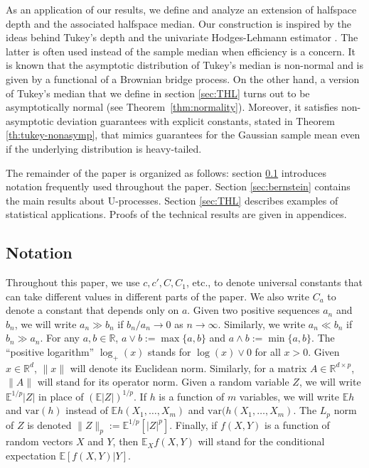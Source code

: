 \documentclass[12pt]{article}
\newcommand\var{\mathrm{var}}
\def\l{\left}
\def\r{\right}
\newcommand{\mb}{\mathbb}
\theoremstyle{thmstyletwo}%
\theoremstyle{thmstylethree}%
\begin{document}
As an application of our results, we define and analyze an extension of halfspace depth and the associated halfspace median. Our construction is inspired by the ideas behind Tukey's depth \citep{tukey1975mathematics} and the univariate Hodges-Lehmann estimator \citep{hodges1963estimates}. The latter is often used instead of the sample median when efficiency is a concern. It is known \citep{nolan1999min,bai1999asymptotic, masse2002asymptotics} that the asymptotic distribution of Tukey's median is non-normal and is given by a functional of a Brownian bridge process. On the other hand, a version of Tukey's median that we define in section \ref{sec:THL} turns out to be asymptotically normal (see Theorem~\ref{thm:normality}). Moreover, it satisfies non-asymptotic deviation guarantees with explicit constants, stated in Theorem \ref{th:tukey-nonasymp}, that mimics guarantees for the Gaussian sample mean even if the underlying distribution is heavy-tailed. 


The remainder of the paper is organized as follows: section \ref{section:notation} introduces notation frequently used throughout the paper. 
Section \ref{sec:bernstein} contains the main results about U-processes. Section \ref{sec:THL} describes examples of statistical applications. 
Proofs of the technical results are given in appendices. 


\subsection{Notation}
\label{section:notation}

Throughout this paper, we use $c, c', C, C_1$, etc., to denote universal constants that can take different values in different parts of the paper. We also write $C_a$ to denote a constant that depends only on $a$. Given two positive sequences $a_n$ and $b_n$, we will write $a_n \gg b_n$ if $b_n/a_n \rightarrow 0$ as $n \rightarrow \infty$. Similarly, we write $a_n \ll b_n$ if $b_n \gg a_n$. For any $a, b \in \mb R$, $a \vee b := \max\{a,b\}$ and $a \wedge b := \min\{a,b\}$. The ``positive logarithm'' $\log_+(x)$ stands for $\log(x) \vee 0$ for all $x > 0$. 
Given $x\in \mb R^d$, $\|x\|$ will denote its Euclidean norm. Similarly, for a matrix $A\in \mb R^{d\times p}$, $\|A\|$ will stand for its operator norm.  
Given a random variable $Z$, we will write $\mb E^{1/p} |Z|$ in place of $\l(\mb E|Z|\r)^{1/p}$. 
If $h$ is a function of $m$ variables, we will write $\mb Eh$ and $\var(h)$ instead of $\mb Eh(X_1,\ldots,X_m)$ and $\var(h(X_1,\ldots,X_m)$. The $L_p$ norm of $Z$ is denoted $\|Z\|_p:= \mb E^{1/p}\l[\l|Z\r|^p\r]$. 
Finally, if $f(X,Y)$ is a function of random vectors $X$ and $Y$, then $\mb E_X f(X,Y)$ will stand for the conditional expectation $\mb E[f(X,Y)|Y]$.
\end{document}
